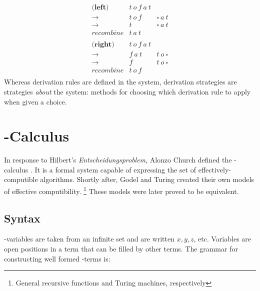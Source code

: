 \[
\begin{array}{rcl}
  
  \textbf{(left)} & t\ o\ f\ a\ t \\
  \to                & t\ o\ f & \square\ a\ t \\
  \to                & t       & \square\ a\ t \\
  \textit{recombine} & t\ a\ t & \\
  \\
  \textbf{(right)}   & t\ o\ f\ a\ t \\
  \to                & f\ a\ t & t\ o\ \square \\
  \to                & f       & t\ o\ \square \\
  \textit{recombine} & t\ o\ f & \\
  
\end{array}
\]
Whereas derivation rules are defined in the system, 
derivation strategies are strategies \emph{about} the system: methods for choosing which derivation rule to apply when given a choice. 

\section{\lam-Calculus}

In response to Hilbert's \emph{Entscheidungsproblem}, Alonzo Church defined the \lam-calculus \cite{ChurchEnt36}. 
It is a formal system capable of expressing the set of effectively-computible algorithms.
Shortly after, Godel and Turing created their own models of effective computibility.
\footnote{General recursive functions and Turing machines, respectively} 
These models were later proved to be equivalent.

\subsection{Syntax}
  
  \lam-variables are taken from an infinite set and are written $x,y,z$, etc. Variables are open positions in a term that can be filled by other terms.
  The grammar for constructing well formed \lam-terms is:

  \begin{figure}[!h]
  \end{figure}

